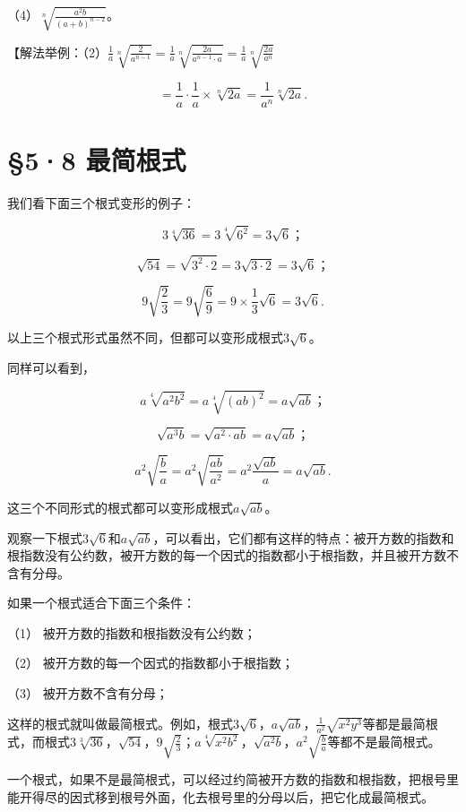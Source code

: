 （4）\(\sqrt[n]{\frac{a^2b}{(a + b)^{n - 2}}}\)。

【解法举例：（2）\(\frac{1}{a}\sqrt[n]{\frac{2}{a^{n-1}}} = \frac{1}{a}\sqrt[n]{\frac{2a}{a^{n-1} \cdot a}} = \frac{1}{a}\sqrt[n]{\frac{2a}{a^n}}\)

\[
= \frac{1}{a} \cdot \frac{1}{a} \times \sqrt[n]{2 a} = \frac{1}{a ^ {n}} \sqrt[n]{2 a}.
\]

\section{§5·8 最简根式}

我们看下面三个根式变形的例子：

\[
3 \sqrt[4]{36} = 3 \sqrt[4]{6 ^ {2}} = 3 \sqrt {6}\text{；}
\]

\[
\sqrt {54} = \sqrt {3 ^ {2} \cdot 2} = 3 \sqrt {3 \cdot 2} = 3 \sqrt {6}\text{；}
\]

\[
9 \sqrt {\frac{2}{3}} = 9 \sqrt {\frac{6}{9}} = 9 \times \frac{1}{3} \sqrt {6} = 3 \sqrt {6}.
\]

以上三个根式形式虽然不同，但都可以变形成根式\(3\sqrt{6}\)。

同样可以看到，

\[
a \sqrt[4]{a ^ {2} b ^ {2}} = a \sqrt[4]{(a b) ^ {2}} = a \sqrt {a b}\text{；}
\]

\[
\sqrt {a ^ {3} b} = \sqrt {a ^ {2} \cdot a b} = a \sqrt {a b}\text{；}
\]

\[
a ^ {2} \sqrt {\frac{b}{a}} = a ^ {2} \sqrt {\frac{a b}{a ^ {2}}} = a ^ {2} \frac{\sqrt {a b}}{a} = a \sqrt {a b}.
\]

这三个不同形式的根式都可以变形成根式\(a\sqrt{ab}\)。

观察一下根式\(3\sqrt{6}\)和\(a\sqrt{ab}\)，可以看出，它们都有这样的特点：被开方数的指数和根指数没有公约数，被开方数的每一个因式的指数都小于根指数，并且被开方数不含有分母。

如果一个根式适合下面三个条件：

（1） 被开方数的指数和根指数没有公约数；

（2） 被开方数的每一个因式的指数都小于根指数；

（3） 被开方数不含有分母；

这样的根式就叫做最简根式。例如，根式\(3\sqrt{6}\)，\(a\sqrt{ab}\)，\(\frac{1}{a^2} \sqrt{x^2y^3}\)等都是最简根式，而根式\(3\sqrt[3]{36}\)，\(\sqrt{54}\)，\(9\sqrt{\frac{2}{3}}\)；\(a\sqrt[4]{x^2b^2}\)，\(\sqrt{a^2b}\)，\(a^2\sqrt{\frac{b}{a}}\)等都不是最简根式。

一个根式，如果不是最简根式，可以经过约简被开方数的指数和根指数，把根号里能开得尽的因式移到根号外面，化去根号里的分母以后，把它化成最简根式。

